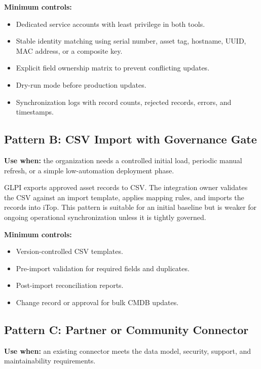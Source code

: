 \documentclass[11pt]{article}
\begin{document}
\textbf{Minimum controls:}
\begin{itemize}
  \item Dedicated service accounts with least privilege in both tools.
  \item Stable identity matching using serial number, asset tag, hostname, UUID, MAC address, or a composite key.
  \item Explicit field ownership matrix to prevent conflicting updates.
  \item Dry-run mode before production updates.
  \item Synchronization logs with record counts, rejected records, errors, and timestamps.
\end{itemize}

\subsection{Pattern B: CSV Import with Governance Gate}

\begin{calloutbox}
\textbf{Use when:} the organization needs a controlled initial load, periodic manual refresh, or a simple low-automation deployment phase.
\end{calloutbox}

GLPI exports approved asset records to CSV. The integration owner validates the CSV against an import template, applies mapping rules, and imports the records into iTop. This pattern is suitable for an initial baseline but is weaker for ongoing operational synchronization unless it is tightly governed.

\textbf{Minimum controls:}
\begin{itemize}
  \item Version-controlled CSV templates.
  \item Pre-import validation for required fields and duplicates.
  \item Post-import reconciliation reports.
  \item Change record or approval for bulk CMDB updates.
\end{itemize}

\subsection{Pattern C: Partner or Community Connector}

\begin{calloutbox}
\textbf{Use when:} an existing connector meets the data model, security, support, and maintainability requirements.
\end{calloutbox}
\end{document}
